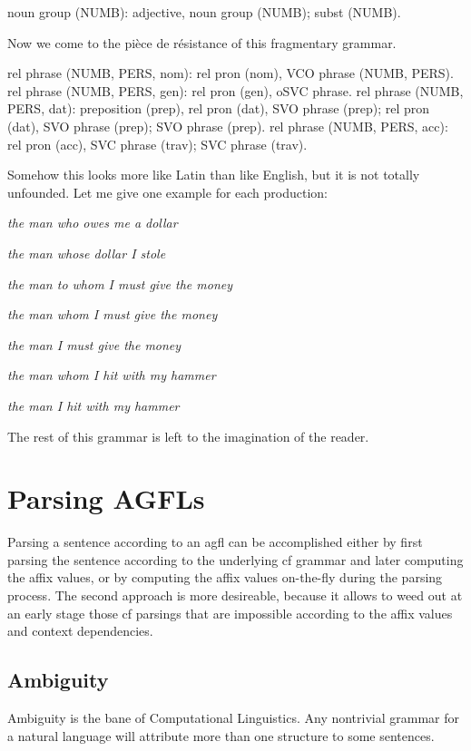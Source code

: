 \begin{elan}
noun group (NUMB):
  adjective, noun group (NUMB);
  subst (NUMB).
\end{elan}
Now we come to the pi\`ece de r\'esistance of this fragmentary grammar.
\begin{elan}
rel phrase (NUMB, PERS, nom):
  rel pron (nom), VCO phrase (NUMB, PERS).
rel phrase (NUMB, PERS, gen):
  rel pron (gen), oSVC phrase.
rel phrase (NUMB, PERS, dat):
  preposition (prep), rel pron (dat), SVO phrase (prep);
  rel pron (dat), SVO phrase (prep);
  SVO phrase (prep).
rel phrase (NUMB, PERS, acc):
  rel pron (acc), SVC phrase (trav);
  SVC phrase (trav).
\end{elan}
Somehow this looks more like Latin than like English, but it is not totally
unfounded. Let me give one example for each production:

{\sl the man who owes me a dollar}

{\sl the man whose dollar I stole}

{\sl the man to whom I must give the money}

{\sl the man whom I must give the money}

{\sl the man I must give the money}

{\sl the man whom I hit with my hammer}

{\sl the man I hit with my hammer}

\noindent
The rest of this grammar is left to the imagination of the reader.
\section{Parsing AGFLs}	
Parsing a sentence according to an {\sc agfl} can be accomplished either by first
parsing the sentence according to the underlying {\sc cf} grammar and later
computing the affix values, or by computing the affix values on-the-fly
during the parsing process.
The second approach is more desireable, because it allows
to weed out at an early stage those {\sc cf} parsings that are impossible
according to the affix values and context dependencies.
\subsection{Ambiguity}
Ambiguity is the bane of Computational Linguistics. Any nontrivial
grammar for a natural language will attribute more than one structure to
some sentences.

